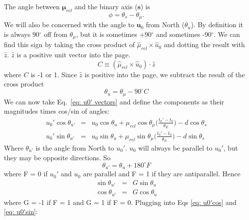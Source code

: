 \documentclass[twocolumn]{aastex701}
\newcommand{\vect}[1]{\boldsymbol{#1}}
\begin{document}
The angle between $\vect{\mu}_{rel}$ and the binary axis ($\vect{s}$) is
\begin{equation}
    \phi = \theta_s - \theta_{\mu}.
\end{equation}
We will also be concerned with the angle to $\vect{u}_0$ from North ($\theta_u$). By definition it is always 90$^{\circ}$ off from $\theta_{\mu}$, but it is sometimes +90$^{\circ}$ and sometimes -90$^{\circ}$. We can find this sign by taking the cross product of $\hat{\mu}_{rel} \times \hat{u}_0$ and dotting the result with $\hat{z}$. $\hat{z}$ is a positive unit vector into the page.
\begin{equation}
\label{eq: C}
    C \equiv (\hat{\mu}_{rel} \times \hat{u}_0) \cdot \hat{z}
\end{equation}
where $C$ is -1 or 1. Since $\hat{z}$ is positive into the page, we subtract the result of the cross product
\begin{equation}
\label{eq: theta_u to theta_mu}
    \theta_u = \theta_{\mu} - 90^{\circ}C
\end{equation}
We can now take Eq.~\ref{eq: u0' vectors} and define the components as their magnitudes times cos/sin of angles:
\begin{eqnarray}
\label{eq: u0'cos}
    u_{0}'\cos\theta_{u'} &=& u_{0}\cos\theta_u + \mu_{rel}\cos\theta_{\mu}\Big(\frac{t_0' - t_0}{\theta_E}\Big) - d\cos\theta_s \\
\label{eq: u0'sin}
    u_{0}'\sin\theta_{u'} &=& u_{0}\sin\theta_u + \mu_{rel}\sin\theta_{\mu}\Big(\frac{t_0' - t_0}{\theta_E}\Big) - d\sin\theta_s
\end{eqnarray}
Where $\theta_{u'}$ is the angle from North to $u_0'$. $u_0$ will always be parallel to $u_0'$, but they may be opposite directions. So
\begin{equation}
    \theta_{u'} = \theta_u + 180^{\circ}F
\end{equation}
where F = 0 if $u_0'$ and $u_0$ are parallel and F = 1 if they are antiparallel. Hence
\begin{eqnarray}
    \sin\theta_{u'} &=& G\sin\theta_u \\
    \cos\theta_{u'} &=& G\cos\theta_u
\end{eqnarray}
where G = -1 if F = 1 and G = 1 if F = 0.
Plugging into Eqs \ref{eq: u0'cos} and \ref{eq: u0'sin}:
\end{document}
